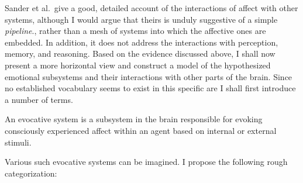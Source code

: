 Sander et al.\ give a good, detailed account of the interactions of affect with other systems, although I would argue that theirs is unduly suggestive of a simple {\em pipeline}., rather than a mesh of systems into which the affective ones are embedded. In addition, it does not address the interactions with perception, memory, and reasoning. Based on the evidence discussed above, I shall now present a more horizontal view and construct a model of the hypothesized emotional subsystems and their interactions with other parts of the brain. Since no established vocabulary seems to exist in this specific are I shall first introduce a number of terms.

\begin{definition}
An evocative system is a subsystem in the brain responsible for evoking consciously experienced affect within an agent based on internal or external stimuli.
\end{definition} 

Various such evocative systems can be imagined. I propose the following rough categorization:

